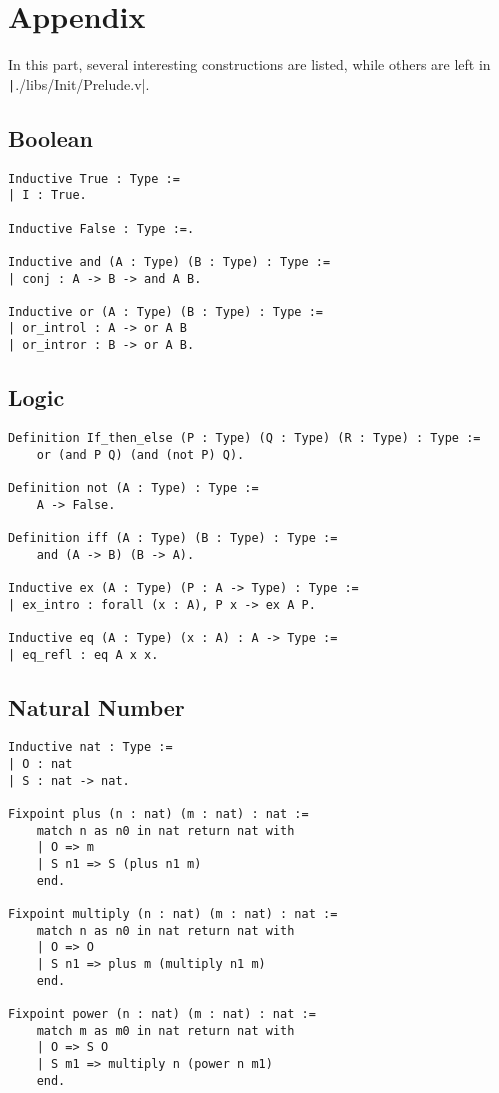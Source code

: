 \section*{Appendix}

In this part, several interesting constructions are listed, 
while others are left in \texttt|./libs/Init/Prelude.v|.

\subsection*{Boolean}
\begin{center}
\begin{verbatim}
Inductive True : Type :=
| I : True.

Inductive False : Type :=.

Inductive and (A : Type) (B : Type) : Type :=
| conj : A -> B -> and A B.

Inductive or (A : Type) (B : Type) : Type :=
| or_introl : A -> or A B
| or_intror : B -> or A B.
\end{verbatim}
\end{center}

\subsection*{Logic}
\begin{center}
\begin{verbatim}
Definition If_then_else (P : Type) (Q : Type) (R : Type) : Type :=
    or (and P Q) (and (not P) Q).

Definition not (A : Type) : Type :=
    A -> False.

Definition iff (A : Type) (B : Type) : Type :=
    and (A -> B) (B -> A).

Inductive ex (A : Type) (P : A -> Type) : Type :=
| ex_intro : forall (x : A), P x -> ex A P.

Inductive eq (A : Type) (x : A) : A -> Type :=
| eq_refl : eq A x x.
\end{verbatim}
\end{center}

\subsection*{Natural Number}
\begin{center}
\begin{verbatim}
Inductive nat : Type :=
| O : nat
| S : nat -> nat.

Fixpoint plus (n : nat) (m : nat) : nat :=
    match n as n0 in nat return nat with
    | O => m
    | S n1 => S (plus n1 m)
    end.

Fixpoint multiply (n : nat) (m : nat) : nat :=
    match n as n0 in nat return nat with
    | O => O
    | S n1 => plus m (multiply n1 m)
    end.

Fixpoint power (n : nat) (m : nat) : nat :=
    match m as m0 in nat return nat with
    | O => S O
    | S m1 => multiply n (power n m1)
    end.
\end{verbatim}
\end{center}

